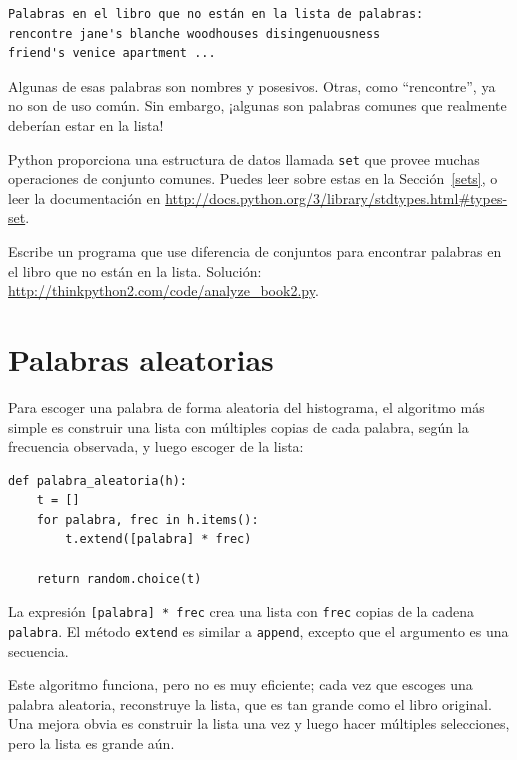 \documentclass[10pt]{book}
\begin{document}
\begin{verbatim}
Palabras en el libro que no están en la lista de palabras:
rencontre jane's blanche woodhouses disingenuousness
friend's venice apartment ...
\end{verbatim}
%
Algunas de esas palabras son nombres y posesivos.  Otras, como
``rencontre'', ya no son de uso común.  Sin embargo, ¡algunas son
palabras comunes que realmente deberían estar en la lista!

\begin{exercise}

Python proporciona una estructura de datos llamada {\tt set} que provee muchas
operaciones de conjunto comunes.  Puedes leer sobre estas en la Sección~\ref{sets},
o leer la documentación en
\url{http://docs.python.org/3/library/stdtypes.html#types-set}.

Escribe un programa que use diferencia de conjuntos para encontrar palabras en el libro
que no están en la lista.  Solución:
\url{http://thinkpython2.com/code/analyze_book2.py}.

\end{exercise}


\section{Palabras aleatorias}
\label{randomwords}

Para escoger una palabra de forma aleatoria del histograma, el algoritmo más simple
es construir una lista con múltiples copias de cada palabra, según
la frecuencia observada, y luego escoger de la lista:

\begin{verbatim}
def palabra_aleatoria(h):
    t = []
    for palabra, frec in h.items():
        t.extend([palabra] * frec)

    return random.choice(t)
\end{verbatim}
%
La expresión {\tt [palabra] * frec} crea una lista con {\tt frec}
copias de la cadena {\tt palabra}.  El método {\tt extend}
es similar a {\tt append}, excepto que el argumento es
una secuencia.

Este algoritmo funciona, pero no es muy eficiente; cada vez que
escoges una palabra aleatoria, reconstruye la lista, que es tan grande como
el libro original.  Una mejora obvia es construir la lista
una vez y luego hacer múltiples selecciones, pero la lista es grande aún.
\end{document}
